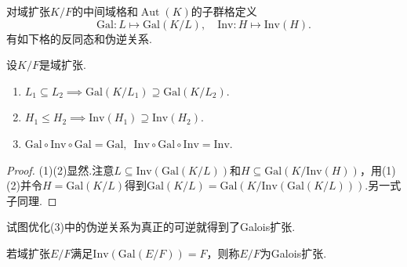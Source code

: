 对域扩张$K/F$的中间域格和$\operatorname*{Aut}(K)$的子群格定义
\[
    \mathrm{Gal}\colon L\mapsto\mathrm{Gal}(K/L),\quad\mathrm{Inv}\colon H\mapsto\mathrm{Inv}(H).
\]
有如下格的反同态和伪逆关系.
\begin{prop}
    设$K/F$是域扩张.
    \begin{enumerate}
        \item $L_1\subseteq L_2\implies\mathrm{Gal}(K/L_1)\supseteq\mathrm{Gal}(K/L_2)$.
        \item $H_1\le H_2\implies\mathrm{Inv}(H_1)\supseteq\mathrm{Inv}(H_2)$.
        \item $\mathrm{Gal}\circ\mathrm{Inv}\circ\mathrm{Gal}=\mathrm{Gal},\enspace\mathrm{Inv}\circ\mathrm{Gal}\circ\mathrm{Inv}=\mathrm{Inv}$.
    \end{enumerate}
\end{prop}
\begin{proof}
    (1)(2)显然.注意$L\subseteq\mathrm{Inv}(\mathrm{Gal}(K/L))$和$H\subseteq\mathrm{Gal}(K/\mathrm{Inv}(H))$，用(1)(2)并令$H=\mathrm{Gal}(K/L)$得到$\mathrm{Gal}(K/L)=\mathrm{Gal}(K/\mathrm{Inv}(\mathrm{Gal}(K/L)))$.另一式子同理.
\end{proof}

试图优化(3)中的伪逆关系为真正的可逆就得到了Galois扩张.
\begin{definition}
    若域扩张$E/F$满足$\mathrm{Inv}(\mathrm{Gal}(E/F))=F$，则称$E/F$为{\heiti Galois扩张}.
\end{definition}


